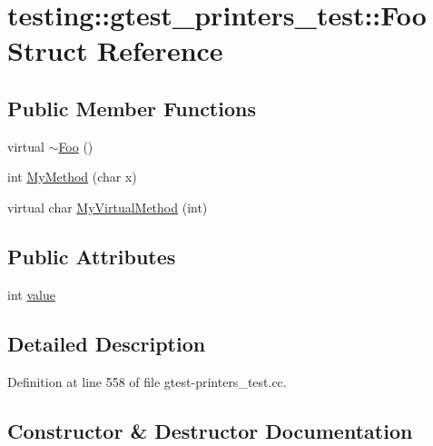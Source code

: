 \hypertarget{structtesting_1_1gtest__printers__test_1_1_foo}{}\section{testing\+:\+:gtest\+\_\+printers\+\_\+test\+:\+:Foo Struct Reference}
\label{structtesting_1_1gtest__printers__test_1_1_foo}
\subsection*{Public Member Functions}
\begin{DoxyCompactItemize}
\item 
virtual \hyperlink{structtesting_1_1gtest__printers__test_1_1_foo_a3797cc88591e06b40208ea7535cf33f6}{$\sim$\+Foo} ()
\item 
int \hyperlink{structtesting_1_1gtest__printers__test_1_1_foo_a703c1159114f3a640b16d470a9613672}{My\+Method} (char x)
\item 
virtual char \hyperlink{structtesting_1_1gtest__printers__test_1_1_foo_a368dc5150b27c2aaca6034830334e1cd}{My\+Virtual\+Method} (int)
\end{DoxyCompactItemize}
\subsection*{Public Attributes}
\begin{DoxyCompactItemize}
\item 
int \hyperlink{structtesting_1_1gtest__printers__test_1_1_foo_a8171a69191d34071ea4448d2dda501ec}{value}
\end{DoxyCompactItemize}


\subsection{Detailed Description}


Definition at line 558 of file gtest-\/printers\+\_\+test.\+cc.



\subsection{Constructor \& Destructor Documentation}
